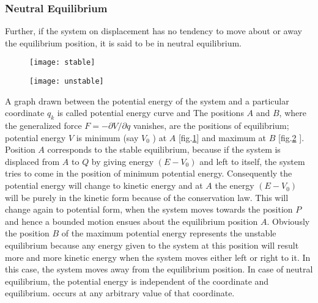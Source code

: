 \subsubsection{Neutral Equilibrium}
 Further, if the system on displacement has no tendency to move about or away the equilibrium position, it is said to be in neutral equilibrium.\\
 \begin{minipage}{0.5\textwidth}
 \begin{figure}[H]
 	\centering
 	\texttt{[image: stable]}
 	\caption{}
 	\label{fig1}
 \end{figure}
 \end{minipage}
\begin{minipage}{0.5\textwidth}
\begin{figure}[H]
	\centering
	\texttt{[image: unstable]}
	\caption{}
	\label{fig2}
\end{figure}
\end{minipage}
A graph drawn between the potential energy of the system and a particular coordinate $q_{k}$ is called potential energy curve and  The positions $A$ and $B$, where the generalized force $F=-\partial V / \partial q$ vanishes, are the positions of equilibrium; potential energy $V$ is minimum (say $V_{0}$ ) at $A$ [fig.\ref{fig1}] and maximum at $B$ [fig.\ref{fig2} ]. Position $A$ corresponds to the stable equilibrium, because if the system is displaced from $A$ to $Q$ by giving energy $\left(E-V_{0}\right)$ and left to itself, the system tries to come in the position of minimum potential energy. Consequently the potential energy will change to kinetic energy and at $A$ the energy $\left(E-V_{0}\right)$ will be purely in the kinetic form because of the conservation law. This will change again to potential form, when the system moves towards the position $P$ and hence a bounded motion ensues about the equilibrium position $A$. Obviously the position $B$ of the maximum potential energy represents the unstable equilibrium because any energy given to the system at this position will result more and more kinetic energy when the system moves either left or right to it. In this case, the system moves away from the equilibrium position. In case of neutral equilibrium, the potential energy is independent of the coordinate and equilibrium. occurs at any arbitrary value of that coordinate.
